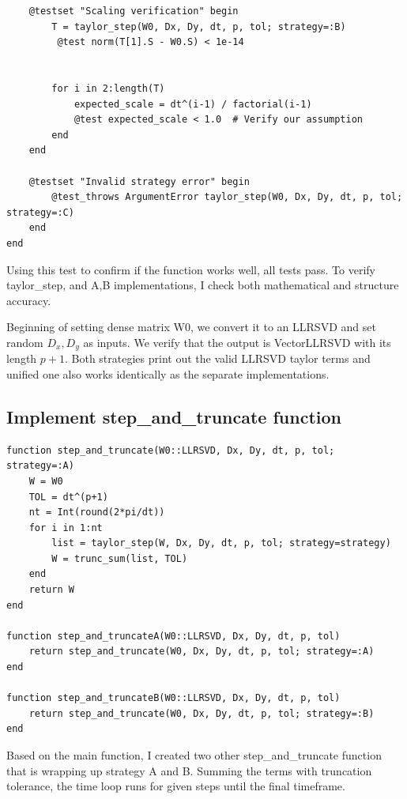 \documentclass[11pt]{report}
\begin{document}
\begin{lstlisting}
    @testset "Scaling verification" begin
        T = taylor_step(W0, Dx, Dy, dt, p, tol; strategy=:B)
         @test norm(T[1].S - W0.S) < 1e-14
        
        
        for i in 2:length(T)
            expected_scale = dt^(i-1) / factorial(i-1)
            @test expected_scale < 1.0  # Verify our assumption
        end
    end

    @testset "Invalid strategy error" begin
        @test_throws ArgumentError taylor_step(W0, Dx, Dy, dt, p, tol; strategy=:C)
    end
end

\end{lstlisting}

Using this test to confirm if the function works well, all tests pass. To verify taylor\_step, and A,B implementations, I check both mathematical and structure accuracy. 

\vspace{0.6em}

Beginning of setting dense matrix W0, we convert it to an LLRSVD and set random $D_x, D_y$ as inputs. We verify that the output is Vector{LLRSVD} with its length $p+1$. Both strategies print out the valid LLRSVD taylor terms and unified one also works identically as the separate implementations. 

\subsection{Implement step\_and\_truncate function}

\begin{lstlisting}
function step_and_truncate(W0::LLRSVD, Dx, Dy, dt, p, tol; strategy=:A)
    W = W0
    TOL = dt^(p+1)
    nt = Int(round(2*pi/dt))
    for i in 1:nt
        list = taylor_step(W, Dx, Dy, dt, p, tol; strategy=strategy)
        W = trunc_sum(list, TOL)
    end
    return W
end

function step_and_truncateA(W0::LLRSVD, Dx, Dy, dt, p, tol)
    return step_and_truncate(W0, Dx, Dy, dt, p, tol; strategy=:A)
end

function step_and_truncateB(W0::LLRSVD, Dx, Dy, dt, p, tol)
    return step_and_truncate(W0, Dx, Dy, dt, p, tol; strategy=:B)
end
\end{lstlisting}

Based on the main function, I created two other step\_and\_truncate function that is wrapping up strategy A and B. Summing the terms with truncation tolerance, the time loop runs for given steps until the final timeframe.
\end{document}
